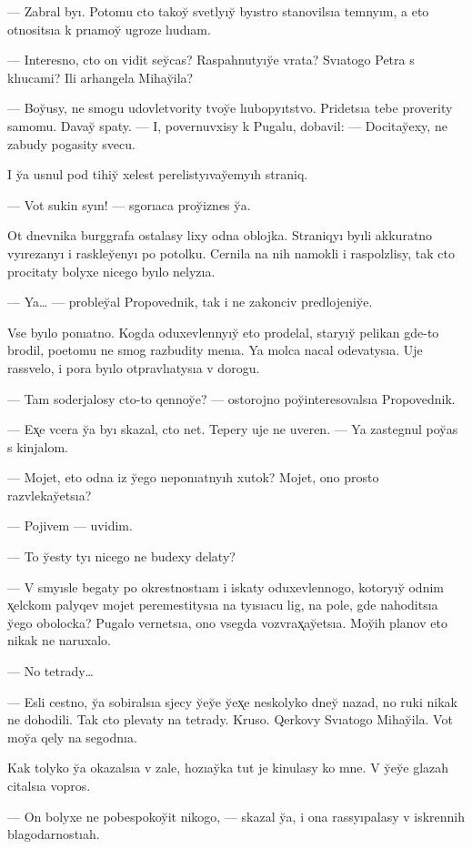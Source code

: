 \documentclass[10pt]{book}
\begin{document}
— Zabral byı. Potomu cto takoy̆ svetlyıy̆ byıstro stanovilsıa temnyım, a eto otnositsıa k prıamoy̆ ugroze lıudıam.

— Interesno, cto on vidit sey̆cas? Raspahnutyıy̆e vrata? Svıatogo Petra s klıucami? Ili arhangela Mihay̆ila?

— Boy̆usy, ne smogu udovletvority tvoy̆e lıubopyıtstvo. Pridetsıa tebe proverity samomu. Davay̆ spaty. — I, povernuvxisy k Pugalu, dobavil: — Docitay̆exy, ne zabudy pogasity svecu.

I y̆a usnul pod tihiy̆ xelest perelistyıvay̆emyıh straniq.



— Vot sukin syın! — sgorıaca proy̆iznes y̆a.

Ot dnevnika burggrafa ostalasy lixy odna oblojka. Straniqyı byıli akkuratno vyırezanyı i raskley̆enyı po potolku. Cernila na nih namokli i raspolzlisy, tak cto procitaty bolyxe nicego byılo nelyzıa.

— Ya… — probley̆al Propovednik, tak i ne zakonciv predlojeniy̆e.

Vse byılo ponıatno. Kogda oduxevlennyıy̆ eto prodelal, staryıy̆ pelikan gde-to brodil, poetomu ne smog razbudity menıa. Ya molca nacal odevatysıa. Uje rassvelo, i pora byılo otpravlıatysıa v dorogu.

— Tam soderjalosy cto-to qennoy̆e? — ostorojno poy̆interesovalsıa Propovednik.

— Ex̨e vcera y̆a byı skazal, cto net. Tepery uje ne uveren. — Ya zastegnul poy̆as s kinjalom.

— Mojet, eto odna iz y̆ego neponıatnyıh xutok? Mojet, ono prosto razvlekay̆etsıa?

— Pojivem — uvidim.

— To y̆esty tyı nicego ne budexy delaty?

— V smyısle begaty po okrestnostıam i iskaty oduxevlennogo, kotoryıy̆ odnim x̨elckom palyqev mojet peremestitysıa na tyısıacu lig, na pole, gde nahoditsıa y̆ego obolocka? Pugalo vernetsıa, ono vsegda vozvrax̨ay̆etsıa. Moy̆ih planov eto nikak ne naruxalo.

— No tetrady…

— Esli cestno, y̆a sobiralsıa sjecy y̆ey̆e y̆ex̨e neskolyko dney̆ nazad, no ruki nikak ne dohodili. Tak cto plevaty na tetrady. Kruso. Qerkovy Svıatogo Mihay̆ila. Vot moy̆a qely na segodnıa.

Kak tolyko y̆a okazalsıa v zale, hozıay̆ka tut je kinulasy ko mne. V y̆ey̆e glazah citalsıa vopros.

— On bolyxe ne pobespokoy̆it nikogo, — skazal y̆a, i ona rassyıpalasy v iskrennih blagodarnostıah.
\end{document}
